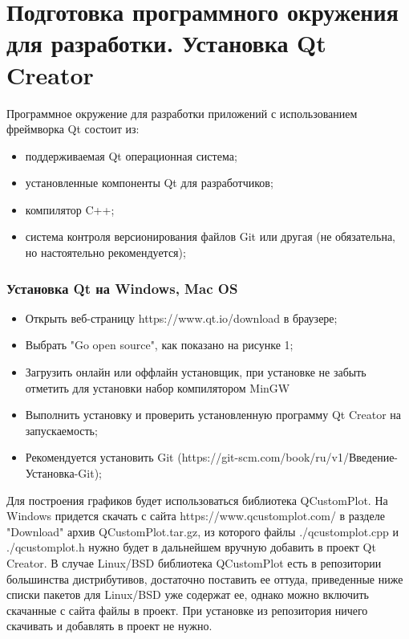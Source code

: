 \section{Подготовка программного окружения для разработки. Установка Qt Creator}

Программное окружение для разработки приложений с использованием фреймворка Qt состоит из:
\begin{itemize}
  \item поддерживаемая Qt операционная система;
  \item установленные компоненты Qt для разработчиков;
  \item компилятор C++;
  \item система контроля версионирования файлов Git или другая (не обязательна, но настоятельно рекомендуется);
\end{itemize}

\subsubsection{Установка Qt на Windows, Mac OS}
\begin{itemize}
  \item Открыть веб-страницу https://www.qt.io/download в браузере;
  \item Выбрать "Go open source", как показано на рисунке 1;
  \item Загрузить онлайн или оффлайн установщик, при установке не забыть отметить для установки набор компилятором MinGW
  \item Выполнить установку и проверить установленную программу Qt Creator на запускаемость;
  \item Рекомендуется установить Git (https://git-scm.com/book/ru/v1/Введение-Установка-Git);
\end{itemize}

Для построения графиков будет использоваться библиотека QCustomPlot. На Windows придется скачать с сайта https://www.qcustomplot.com/ в разделе "Download" архив QCustomPlot.tar.gz, из которого файлы ./qcustomplot.cpp и ./qcustomplot.h нужно будет в дальнейшем вручную добавить в проект Qt Creator. В случае Linux/BSD библиотека QCustomPlot есть в репозитории большинства дистрибутивов, достаточно поставить ее оттуда, приведенные ниже списки пакетов для Linux/BSD уже содержат ее, однако можно включить скачанные с сайта файлы в проект. При установке из репозитория ничего скачивать и добавлять в проект не нужно.

